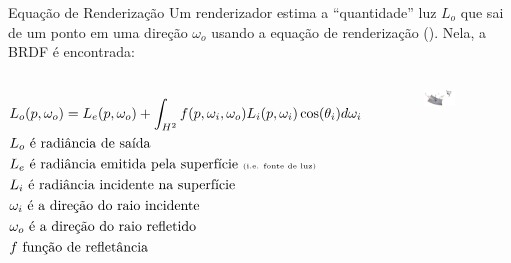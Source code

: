 \begin{frame}{Equação de Renderização}
Um renderizador estima a ``quantidade'' luz $L_o$ que sai de um ponto em uma direção ${\omega}_o$ usando a equação de renderização (\cite{rendering_equation}). Nela, a BRDF é encontrada:

    \begin{columns}
\begin{equation}\label{eq-rendering-equation}
\begin{aligned}
  &L_o(p, {\omega}_o) = L_e(p, {\omega}_o) +
\int_{H^2}f(p, {\omega}_i, {\omega}_o){L_i(p,{\omega}_i)\cos(\theta_i)d{\omega}_i}\\
    &L_o \text{ é radiância de saída}\\
    &L_e \text{ é radiância emitida pela superfície \tiny{(i.e. fonte de luz)}}\\
    &L_i \text{ é radiância incidente na superfície}\\
    &{\omega}_i \text{ é a direção do raio incidente}\\
    &{\omega}_o \text{ é a direção do raio refletido}\\
    &f \text{ função de refletância}\\
\end{aligned}
\end{equation}
    \begin{figure}[H]
        \caption{\cite{MicrofacetBRDF}}
        \vspace{2cm}
        \hspace{2cm}
        \begin{center}
            \includegraphics[width=0.65\textwidth]{./Imagens/Li-Lo.png}
        \end{center}
    \end{figure}
    \end{columns}
\end{frame}



